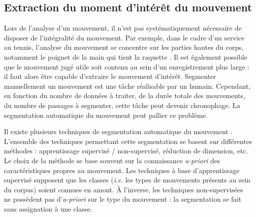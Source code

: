 \subsection{Extraction du moment d'intérêt du mouvement}\label{subsec:MoI}
Lors de l'analyse d'un mouvement, il n'est pas systématiquement nécessaire de disposer de l'intégralité du mouvement. Par exemple, dans le cadre d'un service au tennis, l'analyse du mouvement se concentre sur les parties hautes du corps, notamment le poignet de la main qui tient la raquette \parencite{Makio2007DoS}. Il est également possible que le mouvement jugé utile soit contenu au sein d'un enregistrement plus large : il faut alors être capable d'extraire le mouvement d'intérêt. Segmenter manuellement un mouvement est une tâche réalisable par un humain. Cependant, en fonction du nombre de données à traiter, de la durée totale des mouvements, du nombre de passages à segmenter, cette tâche peut devenir chronophage. La segmentation automatique du mouvement peut pallier ce problème.

Il existe plusieurs techniques de segmentation automatique du mouvement \parencite{Zappella2008MSR}. L'ensemble des techniques permettant cette segmentation se basent sur différentes méthodes : apprentissage supervisé / non-supervisé, réduction de dimension, etc. Le choix de la méthode se base souvent sur la connaissance \textit{a-priori} des caractéristiques propres au mouvement. Les techniques à base d'apprentissage supervisé supposent que les classes (\textit{i.e.} les types de mouvements présents au sein du corpus) soient connues en amont. À l'inverse, les techniques non-supervisées ne possèdent pas d'\textit{a-priori} sur le type du mouvement : la segmentation se fait sans assignation à une classe.

